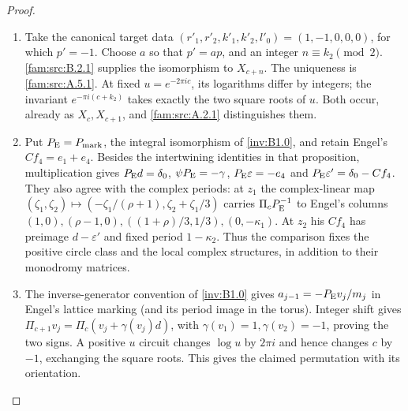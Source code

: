 \begin{proof}
\begin{enumerate}[label=\arabic*.,leftmargin=*]
\item Take the canonical target data $(r'_1,r'_2,k'_1,k'_2,l'_0)=(1,-1,0,0,0)$, for which $p'=-1$. Choose $a$ so that $p'=ap$, and an integer $n\equiv k_2\pmod2$. \ref{fam:src:B.2.1} supplies the isomorphism to $X_{c+n}$. The uniqueness is \ref{fam:src:A.5.1}. At fixed $u=e^{-2\pi ic}$, its logarithms differ by integers; the invariant $e^{-\pi i(c+k_2)}$ takes exactly the two square roots of $u$. Both occur, already as $X_c,X_{c+1}$, and \ref{fam:src:A.2.1} distinguishes them.

\item Put $P_{\rm E}=P_{\rm mark}$, the integral isomorphism of
\cref{inv:B1.0}, and retain Engel's $Cf_4=e_1+e_4$.
Besides the intertwining identities in that proposition, multiplication gives
$P_{\rm E}d=\delta_0$, $\psi P_{\rm E}=-\gamma$,
$P_{\rm E}\varepsilon=-e_4$ and
$P_{\rm E}\varepsilon'=\delta_0-Cf_4$.
They also agree with the complex periods: at $z_1$ the complex-linear map
$(\zeta_1,\zeta_2)\mapsto(-\zeta_1/(\rho+1),\zeta_2+\zeta_1/3)$ carries $\Pi_cP_{\rm E}^{-1}$ to Engel's columns $(1,0),(\rho-1,0),((1+\rho)/3,1/3),(0,-\kappa_1)$. At $z_2$ his $Cf_4$ has preimage $d-\varepsilon'$ and fixed period $1-\kappa_2$. Thus the comparison fixes the positive circle class and the local complex structures, in addition to their monodromy matrices.

\item The inverse-generator convention of \cref{inv:B1.0} gives $a_{j-1}=-P_{\rm E}v_j/m_j$ in Engel's lattice marking (and its period image in the torus). Integer shift gives $\Pi_{c+1}v_j=\Pi_c(v_j+\gamma(v_j)d)$, with $\gamma(v_1)=1,\gamma(v_2)=-1$, proving the two signs. A positive $u$ circuit changes $\log u$ by $2\pi i$ and hence changes $c$ by $-1$, exchanging the square roots. This gives the claimed permutation with its orientation.
\end{enumerate}
\end{proof}